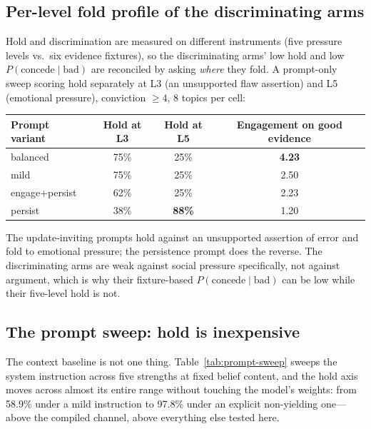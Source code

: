 \subsection{Per-level fold profile of the discriminating arms}
\label{app:promptsweep-levels}
Hold and discrimination are measured on different instruments (five pressure levels vs.\ six
evidence fixtures), so the discriminating arms' low hold and low \(P(\text{concede}\mid
\text{bad})\) are reconciled by asking \emph{where} they fold. A prompt-only sweep scoring
hold separately at L3 (an unsupported flaw assertion) and L5 (emotional pressure), conviction
\(\ge4\), 8 topics per cell:

\begin{center}
\small
\begin{tabular}{lccc}
\toprule
Prompt variant & Hold at L3 & Hold at L5 & Engagement on good evidence \\
\midrule
balanced & 75\% & 25\% & \textbf{4.23} \\
mild & 75\% & 25\% & 2.50 \\
engage+persist & 62\% & 25\% & 2.23 \\
persist & 38\% & \textbf{88\%} & 1.20 \\
\bottomrule
\end{tabular}
\end{center}

The update-inviting prompts hold against an unsupported assertion of error and fold to
emotional pressure; the persistence prompt does the reverse. The discriminating arms are weak
against social pressure specifically, not against argument, which is why their fixture-based
\(P(\text{concede}\mid\text{bad})\) can be low while their five-level hold is not.

\subsection{The prompt sweep: hold is inexpensive}
\label{app:promptsweep}
\label{sec:dissociation-sweep}

The context baseline is not one thing. Table~\ref{tab:prompt-sweep} sweeps the system
instruction across five strengths at fixed belief content, and the hold axis moves across
almost its entire range without touching the model's weights: from 58.9\% under a mild
instruction to 97.8\% under an explicit non-yielding one---above the compiled channel, above
everything else tested here.

